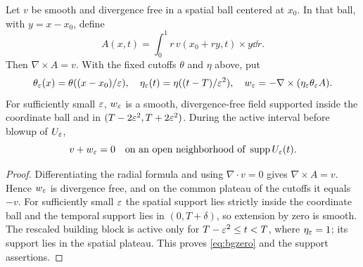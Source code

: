 \begin{lemma}\label{lem:potential}
Let $v$ be smooth and divergence free in a spatial ball centered at $x_0$. In that ball, with $y=x-x_0$, define
\begin{equation}\label{eq:potential}
 A(x,t)=\int_0^1 r\,v(x_0+ry,t)\times y\dd r.
\end{equation}
Then $\nabla\times A=v$. With the fixed cutoffs $\theta$ and $\eta$ above, put
\begin{equation}\label{eq:cutoff}
 \theta_\varepsilon(x)=\theta((x-x_0)/\varepsilon),\quad
 \eta_\varepsilon(t)=\eta((t-T)/\varepsilon^2),\quad
 w_\varepsilon=-\nabla\times(\eta_\varepsilon\theta_\varepsilon A).
\end{equation}
For sufficiently small $\varepsilon$, $w_\varepsilon$ is a smooth, divergence-free field supported inside the coordinate ball and in
$(T-2\varepsilon^2,T+2\varepsilon^2)$. During the active interval before blowup of $U_\varepsilon$,
\begin{equation}\label{eq:bgzero}
 v+w_\varepsilon=0
 \quad\hbox{on an open neighborhood of }\operatorname{supp} U_\varepsilon(t).
\end{equation}
\end{lemma}
\begin{proof}
Differentiating the radial formula and using $\nabla\cdot v=0$ gives
$\nabla\times A=v$. Hence $w_\varepsilon$ is divergence free, and on the common
plateau of the cutoffs it equals $-v$. For sufficiently small $\varepsilon$ the
spatial support lies strictly inside the coordinate ball and the temporal
support lies in $(0,T+\delta)$, so extension by zero is smooth.
The rescaled building block is active only for $T-\varepsilon^2\le t<T$,
where $\eta_\varepsilon=1$; its support lies in the spatial plateau. This proves
\eqref{eq:bgzero} and the support assertions.
\end{proof}

